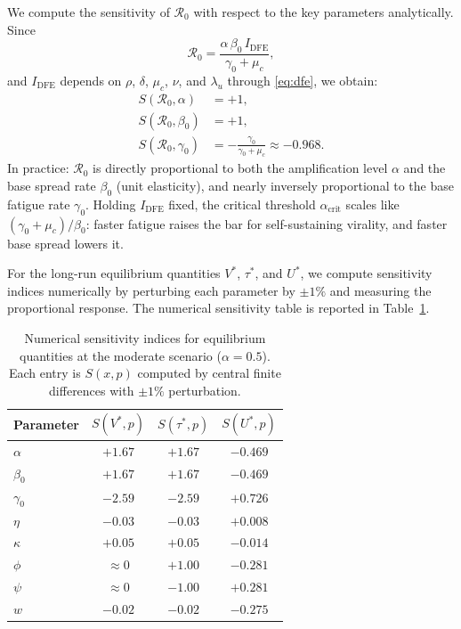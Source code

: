 \documentclass[11pt]{article}
\begin{document}
We compute the sensitivity of $\mathcal{R}_0$ with respect to the key parameters analytically. Since
\[
\mathcal{R}_0 = \frac{\alpha\,\beta_0\,I_{\mathrm{DFE}}}{\gamma_0 + \mu_c},
\]
and $I_{\mathrm{DFE}}$ depends on $\rho$, $\delta$, $\mu_c$, $\nu$, and $\lambda_u$ through \eqref{eq:dfe}, we obtain:
\begin{align*}
S(\mathcal{R}_0, \alpha) &= +1, \\
S(\mathcal{R}_0, \beta_0) &= +1, \\
S(\mathcal{R}_0, \gamma_0) &= -\frac{\gamma_0}{\gamma_0 + \mu_c} \approx -0.968.
\end{align*}
In practice: $\mathcal{R}_0$ is directly proportional to both the amplification level $\alpha$ and the base spread rate $\beta_0$ (unit elasticity), and nearly inversely proportional to the base fatigue rate $\gamma_0$. Holding $I_{\mathrm{DFE}}$ fixed, the critical threshold $\alpha_{\mathrm{crit}}$ scales like $(\gamma_0+\mu_c)/\beta_0$: faster fatigue raises the bar for self-sustaining virality, and faster base spread lowers it.

For the long-run equilibrium quantities $V^*$, $\tau^*$, and $U^*$, we compute sensitivity indices numerically by perturbing each parameter by $\pm 1\%$ and measuring the proportional response. The numerical sensitivity table is reported in Table~\ref{tab:sens}.

\begin{table}[htbp]
\centering
\caption{Numerical sensitivity indices for equilibrium quantities at the moderate scenario ($\alpha = 0.5$). Each entry is $S(x,p)$ computed by central finite differences with $\pm 1\%$ perturbation.}
\label{tab:sens}
\begin{tabular}{lccc}
\toprule
Parameter & $S(V^*, p)$ & $S(\tau^*, p)$ & $S(U^*, p)$ \\
\midrule
$\alpha$ & $+1.67$ & $+1.67$ & $-0.469$ \\
$\beta_0$ & $+1.67$ & $+1.67$ & $-0.469$ \\
$\gamma_0$ & $-2.59$ & $-2.59$ & $+0.726$ \\
$\eta$ & $-0.03$ & $-0.03$ & $+0.008$ \\
$\kappa$ & $+0.05$ & $+0.05$ & $-0.014$ \\
$\phi$ & $\approx 0$ & $+1.00$ & $-0.281$ \\
$\psi$ & $\approx 0$ & $-1.00$ & $+0.281$ \\
$w$ & $-0.02$ & $-0.02$ & $-0.275$ \\
\bottomrule
\end{tabular}
\end{table}
\end{document}
